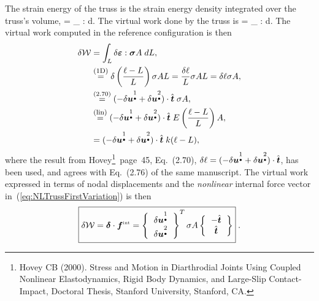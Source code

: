 {The strain energy of the truss is the strain energy 
density integrated over the truss's volume, 
\be
 \cW  = \int_{\Omega} \vsigma : \vhstrain \; d\Omega.
\ee
The virtual work done by the truss is
\be
 \delta \cW = \int_{\Omega} \delta \vhstrain : \vsigma \; d\Omega.
\ee
The virtual work computed in the reference configuration is then 
\begin{align}
  \delta \mathcal{W} & = \int_{L} \delta \mbox{\boldmath $\varepsilon$} : \mbox{\boldmath $\sigma$} A \; dL, \\
  & \overset{\mbox{\footnotesize (1D)}}{=} 
  \delta \left(\displaystyle\frac{\ell - L}{L} \right) \sigma A L 
  = \displaystyle\frac{\delta \ell}{L} \sigma A L = \delta \ell \sigma A, \\
  & \overset{(2.70)}{=} 
  (- \delta \mbox{\boldmath $u$}^{\underset{\bullet}{1}} + 
  \delta \mbox{\boldmath $u$}^{\underset{\bullet}{2}} ) \cdot \hat{\mbox{\boldmath $t$}} 
  \; \sigma A, \label{eq:NLTrussFirstVariation} \\
  & \overset{\mbox{\footnotesize (lin)}}{=} 
  (- \delta \mbox{\boldmath $u$}^{\underset{\bullet}{1}} + 
  \delta \mbox{\boldmath $u$}^{\underset{\bullet}{2}} ) \cdot \hat{\mbox{\boldmath $t$}}  \; 
  E \left( \displaystyle\frac{\ell - L}{L} \right) A, \\
  & = (- \delta \mbox{\boldmath $u$}^{\underset{\bullet}{1}} + 
  \delta \mbox{\boldmath $u$}^{\underset{\bullet}{2}} ) \cdot \hat{\mbox{\boldmath $t$}} \; k (\ell - L),
\end{align}
where the result from 
Hovey\footnote{Hovey CB (2000). Stress and Motion in Diarthrodial 
Joints Using Coupled Nonlinear Elastodynamics, Rigid Body Dynamics, 
and Large-Slip Contact-Impact, Doctoral Thesis, Stanford University, 
Stanford, CA.}~page~45, Eq.~(2.70), 
$\delta \ell = (- \delta \mbox{\boldmath $u$}^{\underset{\bullet}{1}} + 
\delta \mbox{\boldmath $u$}^{\underset{\bullet}{2}} ) \cdot \hat{\mbox{\boldmath $t$}}$, has been used, 
and agrees with Eq.~(2.76) of the same manuscript.
The virtual work expressed in terms of nodal displacements and the 
{\em nonlinear} internal force vector in~(\ref{eq:NLTrussFirstVariation}) is then
\begin{equation}
 \boxed{
  \delta \cW = \vdelta \cdot \vfint = 
   \left\{\begin{tabular}{c}
    $\delta \vu^{\underset{\bullet}{1}}$ \\ $\delta \vu^{\underset{\bullet}{2}}$
   \end{tabular}\right\}^T
   \sigma A 
   \left\{
	  \begin{tabular}{c}
	    $-\vthat$ \\ $\vthat$
          \end{tabular}
   \right\}
   } \; .  
   \label{eq:NLTrussFirstVariationFint}
\end{equation}
}
